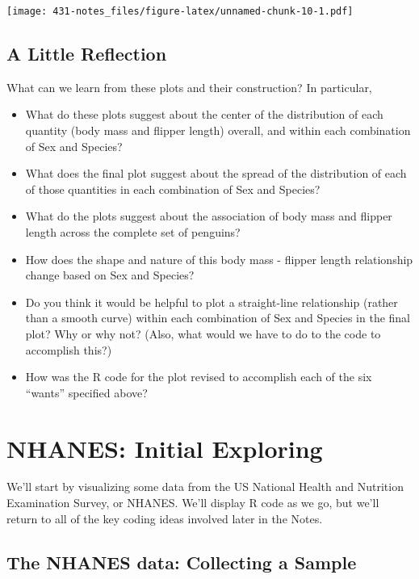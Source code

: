 \documentclass[
]{book}
\providecommand{\tightlist}{%
  \setlength{\itemsep}{0pt}\setlength{\parskip}{0pt}}
\begin{document}
\texttt{[image: 431-notes\_files/figure-latex/unnamed-chunk-10-1.pdf]}

\hypertarget{a-little-reflection}{%
\section{A Little Reflection}\label{a-little-reflection}}

What can we learn from these plots and their construction? In particular,

\begin{itemize}
\tightlist
\item
  What do these plots suggest about the center of the distribution of each quantity (body mass and flipper length) overall, and within each combination of Sex and Species?
\item
  What does the final plot suggest about the spread of the distribution of each of those quantities in each combination of Sex and Species?
\item
  What do the plots suggest about the association of body mass and flipper length across the complete set of penguins?
\item
  How does the shape and nature of this body mass - flipper length relationship change based on Sex and Species?
\item
  Do you think it would be helpful to plot a straight-line relationship (rather than a smooth curve) within each combination of Sex and Species in the final plot? Why or why not? (Also, what would we have to do to the code to accomplish this?)
\item
  How was the R code for the plot revised to accomplish each of the six ``wants'' specified above?
\end{itemize}

\hypertarget{dataviz}{%
\chapter{NHANES: Initial Exploring}\label{dataviz}}

We'll start by visualizing some data from the US National Health and Nutrition Examination Survey, or NHANES. We'll display R code as we go, but we'll return to all of the key coding ideas involved later in the Notes.

\hypertarget{the-nhanes-data-collecting-a-sample}{%
\section{The NHANES data: Collecting a Sample}\label{the-nhanes-data-collecting-a-sample}}
\end{document}

